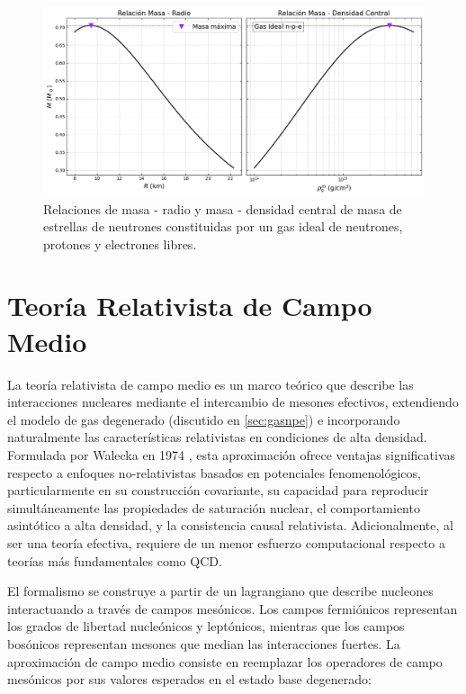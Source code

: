 \begin{figure}
	\centering
	\includegraphics[width=0.9\linewidth]{Figuras/gas_npe_MR}
	\caption{Relaciones de masa - radio y masa - densidad central de masa de estrellas de neutrones constituidas por un gas ideal de neutrones, protones y electrones libres.}
	\label{fig:mrnpe}
\end{figure}



\section{Teoría Relativista de Campo Medio}

La teoría relativista de campo medio es un marco teórico que describe las interacciones nucleares mediante el intercambio de mesones efectivos, extendiendo el modelo de gas degenerado (discutido en \ref{sec:gasnpe}) e incorporando naturalmente las características relativistas en condiciones de alta densidad. Formulada por Walecka en 1974 \cite{waleckaTheoryHighlyCondensed1974}, esta aproximación ofrece ventajas significativas respecto a enfoques no-relativistas basados en potenciales fenomenológicos, particularmente en su construcción covariante, su capacidad para reproducir simultáneamente las propiedades de saturación nuclear, el comportamiento asintótico a alta densidad, y la consistencia causal relativista. Adicionalmente, al ser una teoría efectiva, requiere de un menor esfuerzo computacional respecto a teorías más fundamentales como QCD.

El formalismo se construye a partir de un lagrangiano que describe nucleones interactuando a través de campos mesónicos. Los campos fermiónicos representan los grados de libertad nucleónicos y leptónicos, mientras que los campos bosónicos representan mesones que median las interacciones fuertes. La aproximación de campo medio consiste en reemplazar los operadores de campo mesónicos por sus valores esperados en el estado base degenerado:

